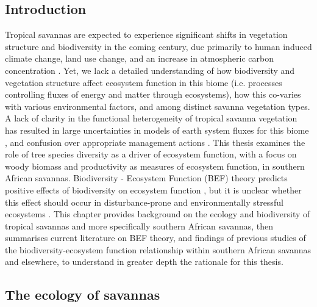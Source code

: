 \begin{refsection}


\chapter[\chaptertitle]{\chaptertitle}
\label{ch:background}

\clearpage{}
\section{Introduction}
\label{background:sec:intro}

Tropical savannas are expected to experience significant shifts in vegetation structure and biodiversity in the coming century, due primarily to human induced climate change, land use change, and an increase in atmospheric carbon concentration \citep{Ross2021, Scheiter2009, Moncrieff2016}. Yet, we lack a detailed understanding of how biodiversity and vegetation structure affect ecosystem function in this biome (i.e. processes controlling fluxes of energy and matter through ecosystems), how this co-varies with various environmental factors, and among distinct savanna vegetation types. A lack of clarity in the functional heterogeneity of tropical savanna vegetation has resulted in large uncertainties in models of earth system fluxes for this biome \citep{Ahlstrom2015}, and confusion over appropriate management actions \citep{Veldman2015}. This thesis examines the role of tree species diversity as a driver of ecosystem function, with a focus on woody biomass and productivity as measures of ecosystem function, in southern African savannas. Biodiversity - Ecosystem Function (BEF) theory predicts positive effects of biodiversity on ecosystem function \citep{Tilman2014}, but it is unclear whether this effect should occur in disturbance-prone and environmentally stressful ecosystems \citep{Steudel2012, Baert2018}. This chapter provides background on the ecology and biodiversity of tropical savannas and more specifically southern African savannas, then summarises current literature on BEF theory, and findings of previous studies of the biodiversity-ecosystem function relationship within southern African savannas and elsewhere, to understand in greater depth the rationale for this thesis.

\section{The ecology of savannas}
\label{background:sec:savanna}


\end{refsection}

